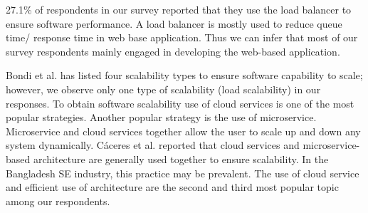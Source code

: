 27.1\% of respondents in our survey reported that they use the load balancer to ensure software performance. A load balancer is mostly used to reduce queue time/ response time in web base application\cite{Mesbahi2016}. Thus we can infer that most of our survey respondents mainly engaged in developing the web-based application.


Bondi et al.\cite{Bondi2000} has listed four scalability types to ensure software capability to scale; however, we observe only one type of scalability (load scalability) in our responses. To obtain software scalability use of cloud services is one of the most popular strategies\cite{Gao2011}. Another popular strategy is the use of microservice. Microservice and cloud services together allow the user to scale up and down any system dynamically. Cáceres et al.\cite{Cceres2010} reported that cloud services and microservice-based architecture are generally used together to ensure scalability. In the Bangladesh SE industry, this practice may be prevalent. The use of cloud service and efficient use of architecture are the second and third most popular topic among our respondents.